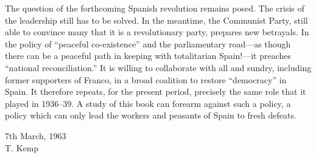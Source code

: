 The question of the forthcoming Spanish revolution remains posed. The crisis of the leadership still has to be solved. In the meantime, the Communist Party, still able to convince many that it is a revolutionary party, prepares new betrayals. In the policy of ``peaceful co-existence'' and the parliamentary road---as though there can be a peaceful path in keeping with totalitarian Spain!---it preaches ``national reconciliation.'' It is willing to collaborate with all and sundry, including former supporters of Franco, in a broad coalition to restore ``democracy'' in Spain. It therefore repeats, for the present period, precisely the same role that it played in 1936--39. A study of this book can forearm against such a policy, a policy which can only lead the workers and peasants of Spain to fresh defeats.

\begin{flushright}
  7th March, 1963 \\
  T. Kemp
\end{flushright}